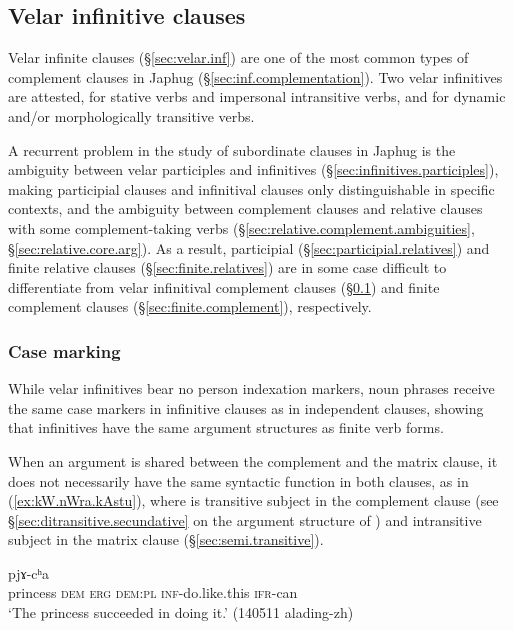 \subsection{Velar infinitive clauses} \label{sec:velar.infinitives.complement.clauses}
Velar infinite clauses (§\ref{sec:velar.inf}) are one of the most common types of complement clauses in Japhug (§\ref{sec:inf.complementation}). Two velar infinitives are attested,  for stative verbs and impersonal intransitive verbs, and  for dynamic and/or morphologically transitive verbs. 

A recurrent problem in the study of subordinate clauses in Japhug is the ambiguity between velar participles and infinitives (§\ref{sec:infinitives.participles}), making participial clauses and infinitival clauses only distinguishable in specific contexts, and the ambiguity between complement clauses and relative clauses with some com\-ple\-ment-taking verbs (§\ref{sec:relative.complement.ambiguities}, §\ref{sec:relative.core.arg}). As a result, participial (§\ref{sec:participial.relatives}) and finite  relative clauses  (§\ref{sec:finite.relatives}) are in some case difficult to differentiate from velar infinitival complement clauses (§\ref{sec:velar.infinitives.complement.clauses}) and finite complement clauses  (§\ref{sec:finite.complement}), respectively. 


\subsubsection{Case marking} \label{sec:case.infinitive}
While velar infinitives bear no person indexation markers, noun phrases receive the same case markers in infinitive clauses as in independent clauses, showing that infinitives have the same argument structures as finite verb forms.

When an argument is shared between the complement and the matrix clause, it does not necessarily have the same syntactic function in both clauses, as in (\ref{ex:kW.nWra.kAstu}), where  is transitive subject in the complement clause (see §\ref{sec:ditransitive.secundative} on the argument structure of ) and intransitive subject in the matrix clause (§\ref{sec:semi.transitive}). 

\begin{exe}
\ex \label{ex:kW.nWra.kAstu}
 pjɤ-cʰa \\
princess \textsc{dem} \textsc{erg} \textsc{dem}:\textsc{pl} \textsc{inf}-do.like.this \textsc{ifr}-can \\
\glt `The princess succeeded in doing it.' (140511 alading-zh)
\end{exe}

